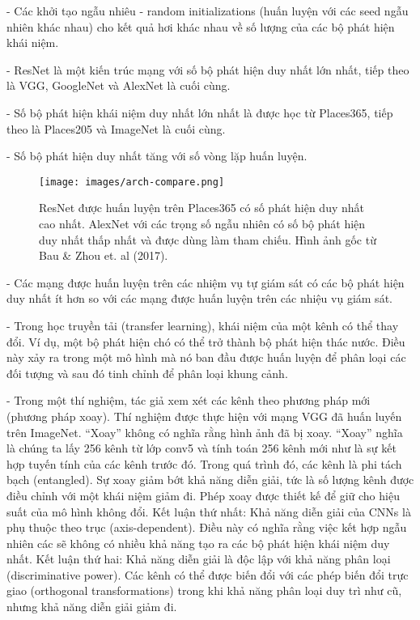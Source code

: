 - Các khởi tạo ngẫu nhiêu - random initializations (huấn luyện với các seed ngẫu nhiên khác nhau) cho kết quả hơi khác nhau về số lượng của các bộ phát hiện khái niệm.

- ResNet là một kiến trúc mạng với số bộ phát hiện duy nhất lớn nhất, tiếp theo là VGG, GoogleNet và AlexNet là cuối cùng.

- Số bộ phát hiện khái niệm duy nhất lớn nhất là được học từ Places365, tiếp theo là Places205 và ImageNet là cuối cùng.

- Số bộ phát hiện duy nhất tăng với số vòng lặp huấn luyện.


\begin{figure*}[h!]
	\centering
	\texttt{[image: images/arch-compare.png]}
	\label{fig:7_9}
	\caption{ResNet được huấn luyện trên Places365 có số phát hiện duy nhất cao nhất. AlexNet với các trọng số ngẫu nhiên có số bộ phát hiện duy nhất thấp nhất và được dùng làm tham chiếu. Hình ảnh gốc từ Bau \& Zhou et. al (2017).}
\end{figure*}

- Các mạng được huấn luyện trên các nhiệm vụ tự giám sát có các bộ phát hiện duy nhất ít hơn so với các mạng được huấn luyện trên các nhiệu vụ giám sát.

- Trong học truyền tải (transfer learning), khái niệm của một kênh có thể thay đổi. Ví dụ, một bộ phát hiện chó có thể trở thành bộ phát hiện thác nước. Điều này xảy ra trong một mô hình mà nó ban đầu được huấn luyện để phân loại các đối tượng và sau đó tinh chỉnh để phân loại khung cảnh.

- Trong một thí nghiệm, tác giả xem xét các kênh theo phương pháp mới (phương pháp xoay). Thí nghiệm được thực hiện với mạng VGG đã huấn luyến trên ImageNet. “Xoay” không có nghĩa rằng hình ảnh đã bị xoay. “Xoay” nghĩa là chúng ta lấy 256 kênh từ lớp conv5 và tính toán 256 kênh mới như là sự kết hợp tuyến tính của các kênh trước đó. Trong quá trình đó, các kênh là phi tách bạch (entangled). Sự xoay giảm bớt khả năng diễn giải, tức là số lượng kênh được điều chỉnh với một khái niệm giảm đi. Phép xoay được thiết kế để giữ cho hiệu suất của mô hình không đổi. Kết luận thứ nhất: Khả năng diễn giải của CNNs là phụ thuộc theo trục (axis-dependent). Điều này có nghĩa rằng việc kết hợp ngẫu nhiên các sẽ không có nhiều khả năng tạo ra các bộ phát hiện khái niệm duy nhất. Kết luận thứ hai: Khả năng diễn giải là độc lập với khả năng phân loại (discriminative power). Các kênh có thể được biến đổi với các phép biến đổi trực giao (orthogonal transformations) trong khi khả năng phân loại duy trì như cũ, nhưng khả năng diễn giải giảm đi.

